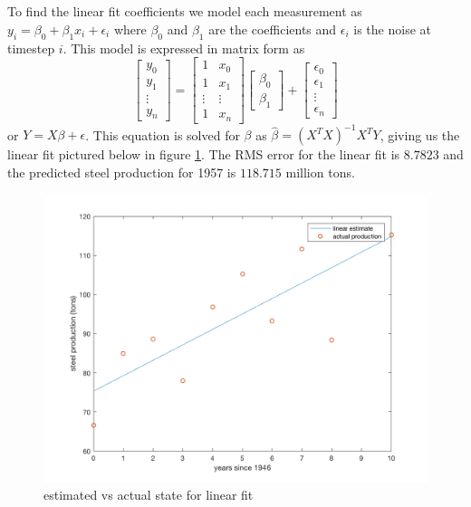\documentclass[11pt]{article}
\begin{document}
\subparagraph*{}
To find the linear fit coefficients we model each measurement as $y_i = \beta_0 + \beta_1x_i + \epsilon_i$ where $\beta_0$ and $\beta_1$ are the coefficients and $\epsilon_i$ is the noise at timestep $i$. This model is expressed in matrix form as 
\begin{equation*}
	\begin{bmatrix} y_0 \\ y_1 \\ \vdots \\ y_n \end{bmatrix} = \begin{bmatrix} 1 & x_0 \\ 1 & x_1 \\ \vdots & \vdots \\ 1 & x_n \end{bmatrix} \begin{bmatrix} \beta_0 \\ \beta_1 \end{bmatrix} + \begin{bmatrix} \epsilon_0 \\ \epsilon_1 \\ \vdots \\ \epsilon_n \end{bmatrix}
\end{equation*}
or $Y=X\beta + \epsilon$. This equation is solved for $\beta$ as $\hat{\beta}=(X^TX)^{-1}X^TY$, giving us the linear fit pictured below in figure \ref{p1_plot1}. The RMS error for the linear fit is $8.7823$ and the predicted steel production for 1957 is $118.715$ million tons. 
\begin{figure}[h!]
	\centering
	\includegraphics[width=0.8\linewidth]{p1_plot1.png}
	\caption{estimated vs actual state for linear fit}
	\label{p1_plot1}
\end{figure}
\end{document}
